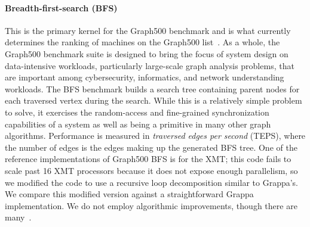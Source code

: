 
\paragraph{Breadth-first-search (BFS)}
This is the primary kernel for the Graph500 benchmark and is what
currently determines the ranking of machines on the Graph500
list~\cite{graph500list}. As a whole, the Graph500 benchmark suite is
designed to bring the focus of system design on data-intensive
workloads, particularly large-scale graph analysis problems, that are
important among cybersecurity, informatics, and network understanding
workloads. The BFS benchmark builds a search tree containing parent
nodes for each traversed vertex during the search.  While this is a
relatively simple problem to solve, it exercises the random-access and
fine-grained synchronization capabilities of a system as well as being
a primitive in many other graph algorithms. Performance is measured in
\emph{traversed edges per second\/} (TEPS), where the number of edges is
the edges making up the generated BFS tree. One of the reference
implementations of Graph500 BFS is for the XMT; this code fails to
scale past 16 XMT processors because it does not expose enough
parallelism, so we modified the code to use a recursive loop
decomposition similar to Grappa's. We compare this modified version
against a straightforward Grappa implementation. We do not employ
algorithmic improvements, though there are
many~\cite{Beamer:Graph500,Yoo:FixedPointGraph500}.

